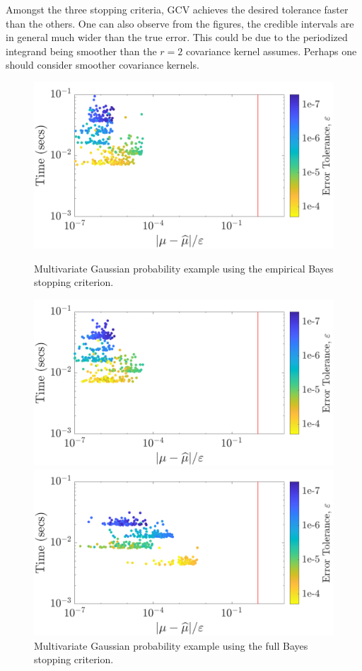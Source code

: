 \documentclass[twocolumn]{svjour3}          %
\begin{document}
Amongst the three stopping criteria, GCV achieves the desired tolerance faster than the others. 
One can also observe from the figures, the credible intervals are in general much wider than the true error.
This could be due to the periodized integrand being smoother than the $r=2$ covariance kernel assumes. Perhaps one should consider smoother covariance kernels.

\begin{figure}
	\centering
	\includegraphics[width=0.98\linewidth]{"Lattice_MVN_guaranteed_time_MLE_C2sin_d2_r2_2019-Jun-27"}
	\caption[Guaranteed:]{Multivariate Gaussian probability example using the empirical Bayes stopping criterion.}
	\label{fig:mvn-guaranteed-MLE}
	\centering
	\includegraphics[width=0.98\linewidth]{"Lattice_MVN_guaranteed_time_full_C2sin_d2_r2_2019-Jun-27"}
	\caption[MVN guaranteed : FB]{Multivariate Gaussian probability example using the full Bayes stopping criterion.}
	\label{fig:mvn-guaranteed-FB}
	\centering
	\includegraphics[width=0.98\linewidth]{"Lattice_MVN_guaranteed_time_GCV_C2sin_d2_r2_2019-Jun-27"}

\end{figure}
\end{document}
